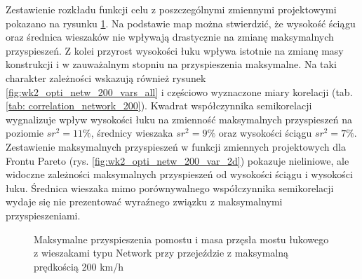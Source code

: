 Zestawienie rozkładu funkcji celu z poszczególnymi zmiennymi projektowymi pokazano na rysunku \ref{fig:wk2_opti_netw_200_variables}. Na podstawie map można stwierdzić, że wysokość ściągu oraz średnica wieszaków nie wpływają drastycznie na zmianę maksymalnych przyspieszeń. Z kolei przyrost wysokości łuku wpływa istotnie na zmianę masy konstrukcji i w zauważalnym stopniu na przyspieszenia maksymalne. Na taki charakter zależności wskazują również rysunek \ref{fig:wk2_opti_netw_200_vars_all} i częściowo wyznaczone miary korelacji (tab. \ref{tab: correlation_network_200}). Kwadrat współczynnika semikorelacji wygnalizuje wpływ wysokości łuku na zmienność maksymalnych przyspieszeń na poziomie $sr^2=11\%$, średnicy wieszaka $sr^2 = 9\%$ oraz wysokości ściągu $sr^2 = 7\%$. Zestawienie maksymalnych przyspieszeń w funkcji zmiennych projektowych dla Frontu Pareto (rys. \ref{fig:wk2_opti_netw_200_var_2d}) pokazuje nieliniowe, ale widoczne zależności maksymalnych przyspieszeń od wysokości ściągu i wysokości łuku. Średnica wieszaka mimo porównywalnego współczynnika semikorelacji wydaje się nie prezentować wyraźnego związku z maksymalnymi przyspieszeniami.



\begin{figure}[hbt!]
	\centering
	\captionsetup{justification=centering}
	\caption{Maksymalne przyspieszenia pomostu i masa przęsła mostu łukowego z wieszakami typu Network przy przejeździe z maksymalną prędkością 200 km/h}
	\label{fig:wk2_opti_netw_200_variables}
\end{figure}

